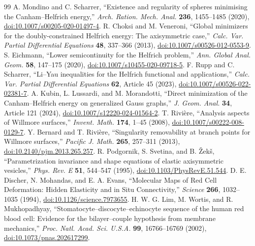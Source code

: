 \documentclass[preprint,amsmath,amssymb,aps,prl,superscriptaddress,nofootinbib,floatfix]{revtex4-2}
\begin{document}
\begin{thebibliography}{99}
 A. Mondino and C. Scharrer, ``Existence and regularity of spheres minimising the Canham--Helfrich energy,'' \emph{Arch. Ration. Mech. Anal.} \textbf{236}, 1455--1485 (2020), \href{https://doi.org/10.1007/s00205-020-01497-4}{doi:10.1007/s00205-020-01497-4}.
 R. Choksi and M. Veneroni, ``Global minimizers for the doubly-constrained Helfrich energy: The axisymmetric case,'' \emph{Calc. Var. Partial Differential Equations} \textbf{48}, 337--366 (2013), \href{https://doi.org/10.1007/s00526-012-0553-9}{doi:10.1007/s00526-012-0553-9}.
 S. Eichmann, ``Lower semicontinuity for the Helfrich problem,'' \emph{Ann. Global Anal. Geom.} \textbf{58}, 147--175 (2020), \href{https://doi.org/10.1007/s10455-020-09718-5}{doi:10.1007/s10455-020-09718-5}.
 F. Rupp and C. Scharrer, ``Li--Yau inequalities for the Helfrich functional and applications,'' \emph{Calc. Var. Partial Differential Equations} \textbf{62}, Article 45 (2023), \href{https://doi.org/10.1007/s00526-022-02381-7}{doi:10.1007/s00526-022-02381-7}.
 A. Kubin, L. Lussardi, and M. Morandotti, ``Direct minimization of the Canham--Helfrich energy on generalized Gauss graphs,'' \emph{J. Geom. Anal.} \textbf{34}, Article 121 (2024), \href{https://doi.org/10.1007/s12220-024-01564-2}{doi:10.1007/s12220-024-01564-2}.
 T. Rivi\`ere, ``Analysis aspects of Willmore surfaces,'' \emph{Invent. Math.} \textbf{174}, 1--45 (2008), \href{https://doi.org/10.1007/s00222-008-0129-7}{doi:10.1007/s00222-008-0129-7}.
 Y. Bernard and T. Rivi\`ere, ``Singularity removability at branch points for Willmore surfaces,'' \emph{Pacific J. Math.} \textbf{265}, 257--311 (2013), \href{https://doi.org/10.2140/pjm.2013.265.257}{doi:10.2140/pjm.2013.265.257}.
 R. Podgornik, S. Svetina, and B. \v{Z}ek\v{s}, ``Parametrization invariance and shape equations of elastic axisymmetric vesicles,'' \emph{Phys. Rev. E} \textbf{51}, 544--547 (1995), \href{https://doi.org/10.1103/PhysRevE.51.544}{doi:10.1103/PhysRevE.51.544}.
 D. E. Discher, N. Mohandas, and E. A. Evans, ``Molecular Maps of Red Cell Deformation: Hidden Elasticity and in Situ Connectivity,'' \emph{Science} \textbf{266}, 1032--1035 (1994), \href{https://doi.org/10.1126/science.7973655}{doi:10.1126/science.7973655}.
 H. W. G. Lim, M. Wortis, and R. Mukhopadhyay, ``Stomatocyte--discocyte--echinocyte sequence of the human red blood cell: Evidence for the bilayer--couple hypothesis from membrane mechanics,'' \emph{Proc. Natl. Acad. Sci. U.S.A.} \textbf{99}, 16766--16769 (2002), \href{https://doi.org/10.1073/pnas.202617299}{doi:10.1073/pnas.202617299}.

\end{thebibliography}
\end{document}
